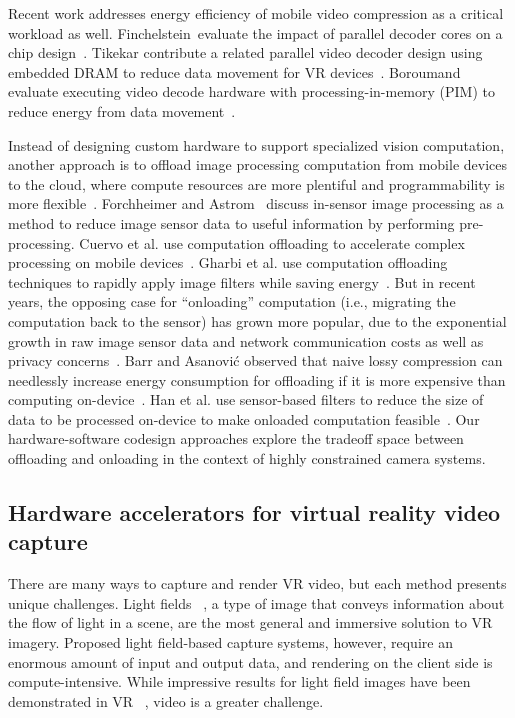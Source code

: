 Recent work addresses energy efficiency of mobile video compression as a critical workload as well.
Finchelstein~\etal evaluate the impact of parallel decoder cores on a \avc chip design~\cite{multicore-avc}.
Tikekar \etal contribute a related parallel video decoder design using embedded DRAM to reduce data movement for VR devices~\cite{tikekar18ijssc}.
Boroumand \etal evaluate executing video decode hardware with processing-in-memory (PIM) to reduce energy from data movement~\cite{google2018asplos}.

Instead of designing custom hardware to support specialized vision computation, another approach is to offload image processing computation from mobile devices to the cloud, where compute resources are more plentiful and programmability is more flexible~\cite{pervasive_compute}.
Forchheimer and Astrom~\cite{Forchheimer94} discuss in-sensor image processing as a method to reduce image sensor data to useful information by performing pre-processing.
Cuervo et al. use computation offloading to accelerate complex processing on mobile devices~\cite{cuervo2010maui}.
Gharbi et al. use computation offloading techniques to rapidly apply image filters while saving energy~\cite{transform_recipes}.
But in recent years, the opposing case for ``onloading'' computation (i.e., migrating the computation back to the sensor) has grown more popular, due to the exponential growth in raw image sensor data and network communication costs as well as privacy concerns~\cite{han-hotos, likamwa-apsys}.
Barr and Asanovi\'{c} observed that naive lossy compression can needlessly increase energy consumption for offloading if it is more expensive than computing on-device~\cite{barr_asanovic}.
Han et al. use sensor-based filters to reduce the size of data to be processed on-device to make onloaded computation feasible~\cite{glimpsedata}.
Our hardware-software codesign approaches explore the tradeoff space between offloading and onloading in the context of highly constrained camera systems.

\subsection{Hardware accelerators for virtual reality video capture}
\label{sec:related:vr-hw}

There are many ways to capture and render VR video, but each method presents unique challenges.
Light fields ~\cite{levoy1996light}, a type of image that conveys information about the flow of light in a scene, are the most general and immersive solution to VR imagery.
Proposed light field-based capture systems, however, require an enormous amount of input and output data, and rendering on the client side is compute-intensive.
While impressive results for light field images have been demonstrated in VR ~\cite{Huang2015}, video is a greater challenge.

